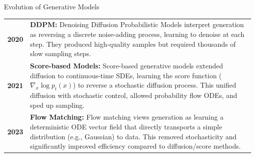 \documentclass[aspectratio=169,xcolor=dvipsnames]{beamer}
\begin{document}
\begin{frame}{Evolution of Generative Models}
    \begin{center}
        \begin{minipage}{0.9\textwidth}
            \vspace{0.3cm}
            
            \small
            \begin{tabular}{@{}l@{\hspace{0.8cm}}p{}@{}}
                \textbf{2020} & \textbf{DDPM:} Denoising Diffusion Probabilistic Models interpret generation as reversing a discrete noise-adding process, learning to denoise at each step. They produced high-quality samples but required thousands of slow sampling steps. \\[0.4cm]
                
                \textbf{2021} & \textbf{Score-based Models:} Score-based generative models extended diffusion to continuous-time SDEs, learning the score function ($\nabla_x \log p_t(x)$) to reverse a stochastic diffusion process. This unified diffusion with stochastic control, allowed probability flow ODEs, and sped up sampling. \\[0.4cm]
                
                \textbf{2023} & \textbf{Flow Matching:} Flow matching views generation as learning a deterministic ODE vector field that directly transports a simple distribution (e.g., Gaussian) to data. This removed stochasticity and significantly improved efficiency compared to diffusion/score methods. \\[0.4cm]
            \end{tabular}
            
            \vspace{0.3cm}
        \end{minipage}
    \end{center}
\end{frame}
\end{document}
